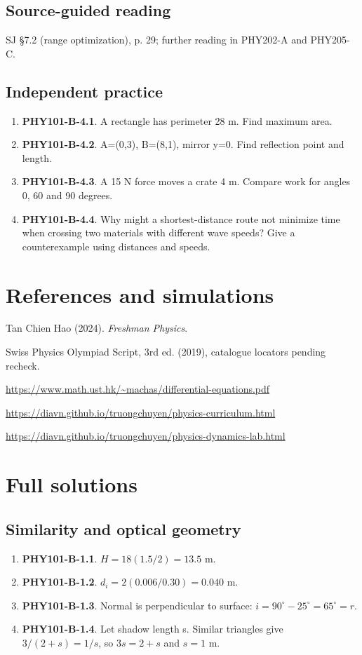 \documentclass[11pt,a4paper,openany]{book}
\begin{document}
\section{Source-guided reading}
SJ §7.2 (range optimization), p. 29; further reading in PHY202-A and PHY205-C.
\section{Independent practice}
\begin{enumerate}
\item \textbf{PHY101-B-4.1}. A rectangle has perimeter 28 m. Find maximum area.
\item \textbf{PHY101-B-4.2}. A=(0,3), B=(8,1), mirror y=0. Find reflection point and length.
\item \textbf{PHY101-B-4.3}. A 15 N force moves a crate 4 m. Compare work for angles 0, 60 and 90 degrees.
\item \textbf{PHY101-B-4.4}. Why might a shortest-distance route not minimize time when crossing two materials with different wave speeds? Give a counterexample using distances and speeds.
\end{enumerate}
\chapter*{References and simulations}
Tan Chien Hao (2024). \textit{Freshman Physics}.\par
Swiss Physics Olympiad Script, 3rd ed. (2019), catalogue locators pending recheck.\par
\url{https://www.math.ust.hk/~machas/differential-equations.pdf}\par
\url{https://diavn.github.io/truongchuyen/physics-curriculum.html}\par
\url{https://diavn.github.io/truongchuyen/physics-dynamics-lab.html}
\appendix
\chapter{Full solutions}
\section{Similarity and optical geometry}
\begin{enumerate}
\item \textbf{PHY101-B-1.1}. $H=18(1.5/2)=13.5$ m.
\item \textbf{PHY101-B-1.2}. $d_i=2(0.006/0.30)=0.040$ m.
\item \textbf{PHY101-B-1.3}. Normal is perpendicular to surface: $i=90^\circ-25^\circ=65^\circ=r$.
\item \textbf{PHY101-B-1.4}. Let shadow length s. Similar triangles give $3/(2+s)=1/s$, so $3s=2+s$ and $s=1$ m.
\end{enumerate}
\end{document}
